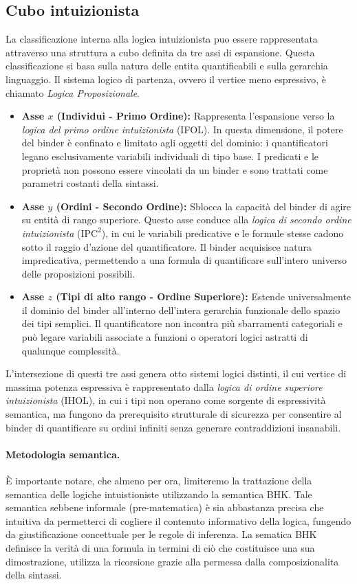 \subsection{Cubo intuizionista}
La classificazione interna alla logica intuizionista puo essere rappresentata attraverso una struttura a cubo definita da tre assi di espansione. Questa classificazione si basa sulla natura delle
entita quantificabili e sulla gerarchia linguaggio. Il sistema logico di partenza, ovvero il vertice meno espressivo, è chiamato \emph{Logica Proposizionale}.
\begin{itemize}
    \item \textbf{Asse $x$ (Individui - Primo Ordine):}  
        Rappresenta l'espansione verso la \emph{logica del primo ordine intuizionista} (IFOL). In questa dimensione, il potere del binder è confinato e limitato agli oggetti del dominio: 
        i quantificatori legano esclusivamente variabili individuali di tipo base. I predicati e le proprietà non possono essere vincolati da un binder e sono trattati come parametri costanti 
        della sintassi.
    \item \textbf{Asse $y$ (Ordini - Secondo Ordine):} 
        Sblocca la capacità del binder di agire su entità di rango superiore. Questo asse conduce alla \emph{logica di secondo ordine intuizionista} ($\text{IPC}^2$), in cui le variabili 
        predicative e le formule stesse cadono sotto il raggio d'azione del quantificatore. Il binder acquisisce natura impredicativa, permettendo a una formula 
        di quantificare sull'intero universo delle proposizioni possibili.
    \item \textbf{Asse $z$ (Tipi di alto rango - Ordine Superiore):}
        Estende universalmente il dominio del binder all'interno dell'intera gerarchia funzionale dello spazio dei tipi semplici. Il quantificatore non incontra più sbarramenti 
        categoriali e può legare variabili associate a funzioni o operatori logici astratti di qualunque complessità.
\end{itemize}
L'intersezione di questi tre assi genera otto sistemi logici distinti, il cui vertice di massima potenza espressiva è rappresentato dalla \emph{logica di ordine superiore intuizionista} 
(IHOL), in cui i tipi non operano come sorgente di espressività semantica, ma fungono da prerequisito strutturale di sicurezza per consentire al binder di quantificare su ordini infiniti 
senza generare contraddizioni insanabili.

\paragraph{Metodologia semantica.}
È importante notare, che almeno per ora, limiteremo la trattazione della semantica delle logiche intuistioniste utilizzando la semantica BHK. Tale semantica sebbene informale (pre-matematica) 
è sia abbastanza precisa che intuitiva da permetterci di cogliere il contenuto informativo della logica, fungendo da giustificazione concettuale per le regole di inferenza. La sematica BHK 
definisce la verità di una formula in termini di ciò che costituisce una sua dimostrazione, utilizza la ricorsione grazie alla permessa dalla composizionalita della sintassi.

